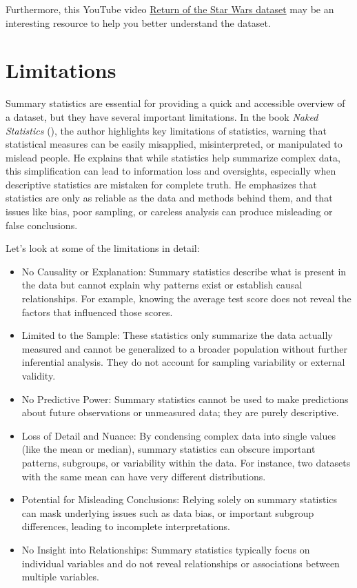 \documentclass[
  man,
  floatsintext,
  longtable,
  nolmodern,
  notxfonts,
  notimes,
  colorlinks=true,linkcolor=blue,citecolor=blue,urlcolor=blue]{apa7}
\begin{document}
Furthermore, this YouTube video
\href{https://www.youtube.com/watch?v=4vSfbz9YMa0}{Return of the Star
Wars dataset} may be an interesting resource to help you better
understand the dataset.

\newpage

\section{Limitations}\label{limitations}

Summary statistics are essential for providing a quick and accessible
overview of a dataset, but they have several important limitations. In
the book \emph{Naked Statistics}
(), the author highlights
key limitations of statistics, warning that statistical measures can be
easily misapplied, misinterpreted, or manipulated to mislead people. He
explains that while statistics help summarize complex data, this
simplification can lead to information loss and oversights, especially
when descriptive statistics are mistaken for complete truth. He
emphasizes that statistics are only as reliable as the data and methods
behind them, and that issues like bias, poor sampling, or careless
analysis can produce misleading or false conclusions.

Let's look at some of the limitations in detail:

\begin{itemize}
\item
  No Causality or Explanation: Summary statistics describe what is
  present in the data but cannot explain why patterns exist or establish
  causal relationships. For example, knowing the average test score does
  not reveal the factors that influenced those scores.
\item
  Limited to the Sample: These statistics only summarize the data
  actually measured and cannot be generalized to a broader population
  without further inferential analysis. They do not account for sampling
  variability or external validity.
\item
  No Predictive Power: Summary statistics cannot be used to make
  predictions about future observations or unmeasured data; they are
  purely descriptive.
\item
  Loss of Detail and Nuance: By condensing complex data into single
  values (like the mean or median), summary statistics can obscure
  important patterns, subgroups, or variability within the data. For
  instance, two datasets with the same mean can have very different
  distributions.
\item
  Potential for Misleading Conclusions: Relying solely on summary
  statistics can mask underlying issues such as data bias, or important
  subgroup differences, leading to incomplete interpretations.
\item
  No Insight into Relationships: Summary statistics typically focus on
  individual variables and do not reveal relationships or associations
  between multiple variables.
\end{itemize}
\end{document}
